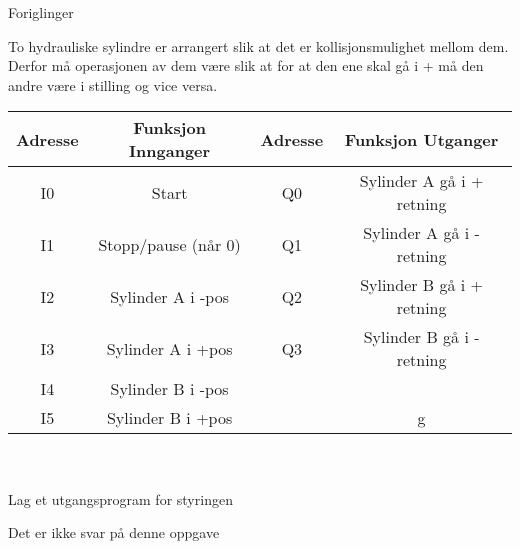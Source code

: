 


Foriglinger

To hydrauliske sylindre er arrangert slik at det er kollisjonsmulighet
mellom dem. Derfor må operasjonen av dem være slik at for at den ene
skal gå i + må den andre være i \textendash stilling og vice versa. 

\begin{tabular}{|c|c|c|c|}
\hline 
Adresse & Funksjon Innganger & Adresse & Funksjon Utganger\tabularnewline
\hline 
\hline 
I0 & Start & Q0 & Sylinder A gå i + retning\tabularnewline
\hline 
I1 & Stopp/pause (når 0) & Q1 & Sylinder A gå i - retning\tabularnewline
\hline 
I2 & Sylinder A i -pos & Q2 & Sylinder B gå i + retning\tabularnewline
\hline 
I3 & Sylinder A i +pos & Q3 & Sylinder B gå i - retning\tabularnewline
\hline 
I4 & Sylinder B i -pos &  & \tabularnewline
\hline 
I5 & Sylinder B i +pos &  & g\tabularnewline
\hline 
\end{tabular}
\\
\\
Lag et utgangsprogram for styringen
\vskip 10pt






Det er ikke svar på denne oppgave












